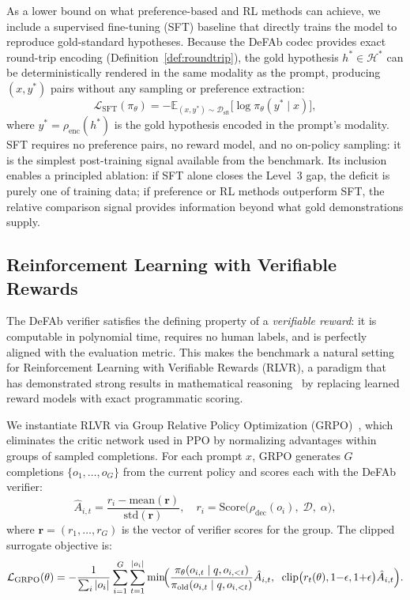 \documentclass{article}
\theoremstyle{definition}
\newcommand{\D}{\mathcal{D}}
\newcommand{\Hgold}{\mathcal{H}^{*}}
\begin{document}
As a lower bound on what preference-based and RL methods can achieve, we include a supervised fine-tuning (SFT) baseline that directly trains the model to reproduce gold-standard hypotheses.  Because the DeFAb codec provides exact round-trip encoding (Definition~\ref{def:roundtrip}), the gold hypothesis $h^* \in \Hgold$ can be deterministically rendered in the same modality as the prompt, producing $(x, y^*)$ pairs without any sampling or preference extraction:
\begin{equation}\label{eq:sft_loss}
    \mathcal{L}_{\mathrm{SFT}}(\pi_\theta) = -\mathbb{E}_{(x, y^*) \sim \mathcal{D}_{\mathrm{sft}}} \bigl[\log \pi_\theta(y^* \mid x)\bigr],
\end{equation}
where $y^* = \rho_{\mathrm{enc}}(h^*)$ is the gold hypothesis encoded in the prompt's modality.  SFT requires no preference pairs, no reward model, and no on-policy sampling: it is the simplest post-training signal available from the benchmark.  Its inclusion enables a principled ablation: if SFT alone closes the Level~3 gap, the deficit is purely one of training data; if preference or RL methods outperform SFT, the relative comparison signal provides information beyond what gold demonstrations supply.


\subsection{Reinforcement Learning with Verifiable Rewards}\label{subsec:rlvr}

The DeFAb verifier satisfies the defining property of a \emph{verifiable reward}: it is computable in polynomial time, requires no human labels, and is perfectly aligned with the evaluation metric.  This makes the benchmark a natural setting for Reinforcement Learning with Verifiable Rewards (RLVR), a paradigm that has demonstrated strong results in mathematical reasoning~\cite{deepseek2025r1} by replacing learned reward models with exact programmatic scoring.

We instantiate RLVR via Group Relative Policy Optimization (GRPO)~\cite{shao2024deepseekmath}, which eliminates the critic network used in PPO by normalizing advantages within groups of sampled completions.  For each prompt $x$, GRPO generates $G$ completions $\{o_1, \ldots, o_G\}$ from the current policy and scores each with the DeFAb verifier:
\begin{equation}\label{eq:grpo_advantage}
    \hat{A}_{i,t} = \frac{r_i - \mathrm{mean}(\mathbf{r})}{\mathrm{std}(\mathbf{r})}, \quad r_i = \mathrm{Score}\bigl(\rho_{\mathrm{dec}}(o_i),\; \D,\; \alpha\bigr),
\end{equation}
where $\mathbf{r} = (r_1, \ldots, r_G)$ is the vector of verifier scores for the group.  The clipped surrogate objective is:
\begin{equation}\label{eq:grpo_loss}
    \mathcal{L}_{\mathrm{GRPO}}(\theta) = -\frac{1}{\sum_i |o_i|} \sum_{i=1}^G \sum_{t=1}^{|o_i|} \min\!\Bigl(\frac{\pi_\theta(o_{i,t} \mid q, o_{i,<t})}{\pi_{\mathrm{old}}(o_{i,t} \mid q, o_{i,<t})} \hat{A}_{i,t},\;\; \mathrm{clip}\bigl(r_t(\theta), 1{-}\epsilon, 1{+}\epsilon\bigr) \hat{A}_{i,t}\Bigr).
\end{equation}
\end{document}

